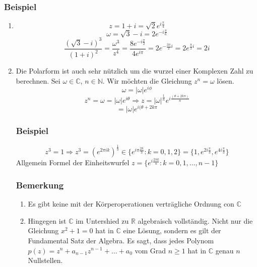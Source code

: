 \subsubsection*{Beispiel}
\begin{enumerate}
\item $$z=1+i=\sqrt{2}e^{i\frac{\pi}{4}}$$
$$\omega=\sqrt{3}-i=2e^{-i\frac{\pi}{6}}$$
$$\frac{\left(\sqrt{3}-i\right)^3}{(1+i)^2}=\frac{\omega^3}{z^4}=\frac{8e^{-i\frac{\pi}{2}}}{4e^{i\pi}}=2e^{-\frac{3\pi}{2}i}=2e^{\frac{\pi}{2}i}=2i$$
\item Die Polarform ist auch sehr nützlich um die wurzel einer Komplexen Zahl zu berechnen. Sei $\omega\in\mathbb{C}$, $n\in\mathbb{N}$. Wir möchten die Gleichung $z^n=\omega$ lösen. 
$$\omega=\left|\omega\right| e^{i\phi}$$
$$z^n=\omega=\left|\omega\right| e^{i\theta}\Rightarrow z=\left| \omega\right|^\frac{1}{n}e^{i\frac{\left(\theta + 2k\pi\right)}{n}}$$
$$=\left| \omega\right| e^{i(\theta +2k\pi}$$
\subsubsection*{Beispiel}
$$z^3=1\Rightarrow z^3=\left( e^{2\pi i k}\right)^\frac{1}{3} \in \{e^{i\pi\frac{2k}{3}}: k=0,1,2\} = \{1,e^{2i\frac{\pi}{3}},e^{4i\frac{\pi}{3}} \}$$
Allgemein Formel der Einheitswurfel $z=\{ e^{i\frac{2\pi k}{n}}:k=0,1,\dots,n-1\}$
\subsubsection*{Bemerkung}
\begin{enumerate}
\item Es gibt keine mit der Körperoperationen verträgliche Ordnung con $\mathbb{C}$
\item Hingegen ist $\mathbb{C}$ im Untershied zu $\mathbb{R}$ algebraisch vollständig. Nicht nur die Gleichung $x^2+1=0$ hat in $\mathbb{C}$ eine Lösung, sondern es gilt der Fundamental Satz der Algebra. Es sagt, dass jedes Polynom $p(z)=z^n+a_{n-1}z^{n-1}+\dots+a_0$ vom Grad $n\geq 1$ hat in $\mathbb{C}$ genau $n$ Nullstellen.
\end{enumerate}
\end{enumerate}











